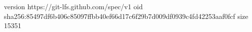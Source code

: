 version https://git-lfs.github.com/spec/v1
oid sha256:85497df6b406c85097ffbb40ef66d17c6f29b7d009df0939c4fd42253aaf0fcf
size 15351
